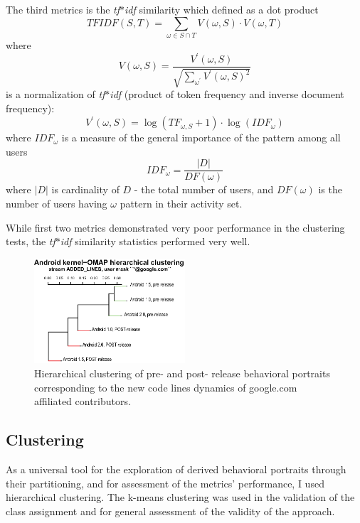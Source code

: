 \documentclass[conference]{worldcomp}
\begin{document}
The third metrics is the \textit{tf$\ast$idf} similarity which defined as a dot product 
\begin{equation}
 TFIDF(S,T) = \sum_{\omega \in S \cap T} V(\omega, S) \cdot V(\omega, T)
\end{equation} 
where 
\begin{equation}
 V(\omega, S) = \frac { V^{\prime} (\omega,S) } { \sqrt{ \sum_{\omega^{\prime}} V^{\prime} (\omega,S)^{2}} }
\end{equation} 
is a normalization of \textit{tf$\ast$idf} (product of token frequency and inverse document frequency):
\begin{equation}
 V^{\prime} (\omega,S) = \log(TF_{\omega, S} +1) \cdot \log(IDF_{\omega})
\end{equation} 
where $IDF_{\omega}$ is a measure of the general importance of the pattern among all users
\begin{equation}
 IDF_{\omega} = \frac{|D|}{DF(\omega)}
\end{equation} 
where $|D|$ is cardinality of $D$ - the total number of users, and $DF(\omega)$ is the number of users 
having $\omega$ pattern in their activity set. 

While first two metrics demonstrated very poor performance in the clustering tests, 
the \textit{tf$\ast$idf} similarity statistics performed very well.

\begin{figure}[t]
  \centering
  \includegraphics[width=0.5\textwidth]{figures/omap-hclust.eps}
  \caption{Hierarchical clustering of pre- and post- release behavioral portraits corresponding to the new code lines dynamics of google.com affiliated contributors.}
  \label{fig:kernel_cluster}
\end{figure}

\subsection{Clustering}
As a universal tool for the exploration of derived behavioral portraits through their partitioning, 
and for assessment of the metrics' performance, I used hierarchical clustering. The k-means
clustering was used in the validation of the class assignment and for general assessment of 
the validity of the approach.
\end{document}
